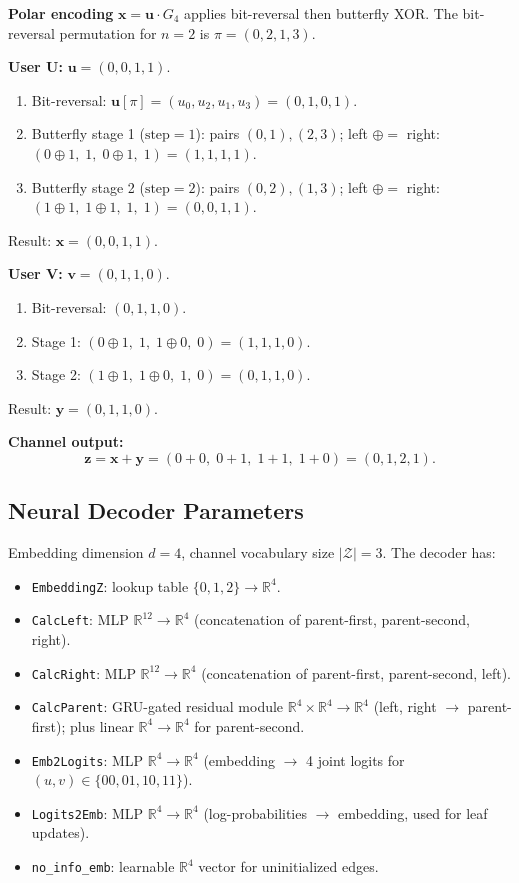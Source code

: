 \documentclass[11pt,a4paper]{article}
\newcommand{\R}{\mathbb{R}}
\begin{document}
\medskip
\textbf{Polar encoding} $\mathbf{x} = \mathbf{u} \cdot G_4$ applies bit-reversal then butterfly XOR.  The bit-reversal permutation for $n=2$ is $\pi = (0, 2, 1, 3)$.

\medskip
\noindent\textbf{User U:} $\mathbf{u} = (0, 0, 1, 1)$.
\begin{enumerate}[nosep]
\item Bit-reversal: $\mathbf{u}[\pi] = (u_0, u_2, u_1, u_3) = (0, 1, 0, 1)$.
\item Butterfly stage 1 ($\text{step}=1$): pairs $(0,1), (2,3)$; left $\oplus=$ right: $(0 \oplus 1,\; 1,\; 0 \oplus 1,\; 1) = (1, 1, 1, 1)$.
\item Butterfly stage 2 ($\text{step}=2$): pairs $(0,2), (1,3)$; left $\oplus=$ right: $(1 \oplus 1,\; 1 \oplus 1,\; 1,\; 1) = (0, 0, 1, 1)$.
\end{enumerate}
Result: $\mathbf{x} = (0, 0, 1, 1)$.

\medskip
\noindent\textbf{User V:} $\mathbf{v} = (0, 1, 1, 0)$.
\begin{enumerate}[nosep]
\item Bit-reversal: $(0, 1, 1, 0)$.
\item Stage 1: $(0 \oplus 1,\; 1,\; 1 \oplus 0,\; 0) = (1, 1, 1, 0)$.
\item Stage 2: $(1 \oplus 1,\; 1 \oplus 0,\; 1,\; 0) = (0, 1, 1, 0)$.
\end{enumerate}
Result: $\mathbf{y} = (0, 1, 1, 0)$.

\medskip
\textbf{Channel output:}
\[
\mathbf{z} = \mathbf{x} + \mathbf{y} = (0+0,\; 0+1,\; 1+1,\; 1+0) = (0, 1, 2, 1).
\]

\subsection{Neural Decoder Parameters}

Embedding dimension $d = 4$, channel vocabulary size $|\mathcal{Z}| = 3$.  The decoder has:
\begin{itemize}[nosep]
\item \texttt{EmbeddingZ}: lookup table $\{0,1,2\} \to \R^4$.
\item \texttt{CalcLeft}: MLP $\R^{12} \to \R^4$ (concatenation of parent-first, parent-second, right).
\item \texttt{CalcRight}: MLP $\R^{12} \to \R^4$ (concatenation of parent-first, parent-second, left).
\item \texttt{CalcParent}: GRU-gated residual module $\R^4 \times \R^4 \to \R^4$ (left, right $\to$ parent-first); plus linear $\R^4 \to \R^4$ for parent-second.
\item \texttt{Emb2Logits}: MLP $\R^4 \to \R^4$ (embedding $\to$ 4 joint logits for $(u,v) \in \{00,01,10,11\}$).
\item \texttt{Logits2Emb}: MLP $\R^4 \to \R^4$ (log-probabilities $\to$ embedding, used for leaf updates).
\item \texttt{no\_info\_emb}: learnable $\R^4$ vector for uninitialized edges.
\end{itemize}
\end{document}
